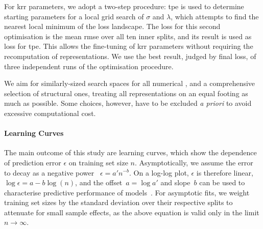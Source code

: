 For \gls{krr} parameters, we adopt a two-step procedure: \gls{tpe} is used to determine starting parameters for a local grid search of $\sigma$ and $\lambda$, which attempts to find the nearest local minimum of the loss landscape.
The loss for this second optimisation is the mean \gls{rmse} over all ten inner splits, and its result is used as loss for \gls{tpe}. This allows the fine-tuning of \gls{krr} parameters without requiring the recomputation of representations. We use the best result, judged by final loss, of three independent runs of the \hp optimisation procedure.

We aim for similarly-sized search spaces for all numerical \hps, and a comprehensive selection of structural ones, treating all representations on an equal footing as much as possible. Some choices, however, have to be excluded \emph{a priori} to avoid excessive computational cost.


\paragraph{Learning Curves}
The main outcome of this study are learning curves, which show the dependence of prediction error $\epsilon$ on training set size $n$.
Asymptotically, we assume the error to decay as a negative power~\cite{afs1992m,mfsa1996m} $\epsilon = a' n^{-b}$.
On a log-log plot, $\epsilon$ is therefore linear, $\log \epsilon = a - b \log(n)$, and the offset~$a = \log a'$ and slope~$b$ can be used to characterise predictive performance of models~\cite{hl2016q}.
For asymptotic fits, we weight training set sizes by the standard deviation over their respective splits to attenuate for small sample effects,
as the above equation is valid only in the limit $n \rightarrow \infty$.

%

